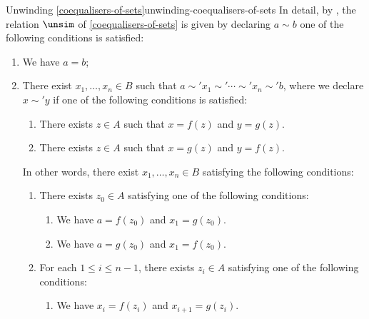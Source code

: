 \begin{remark}{Unwinding \cref{coequalisers-of-sets}}{unwinding-coequalisers-of-sets}%
    In detail, by , the relation $\unsim$ of \cref{coequalisers-of-sets} is given by declaring $a\sim b$ \textiff one of the following conditions is satisfied:%
    \begin{enumerate}
        \item\label{unwinding-coequalisers-of-sets-1}We have $a=b$;
        \item\label{unwinding-coequalisers-of-sets-2}There exist $x_{1},\ldots,x_{n}\in B$ such that $a\sim'x_{1}\sim'\cdots\sim'x_{n}\sim'b$, where we declare $x\sim'y$ if one of the following conditions is satisfied:
            \begin{enumerate}
                \item\label{unwinding-coequalisers-of-sets-2-a}There exists $z\in A$ such that $x=f(z)$ and $y=g(z)$.
                \item\label{unwinding-coequalisers-of-sets-2-b}There exists $z\in A$ such that $x=g(z)$ and $y=f(z)$.
            \end{enumerate}
            In other words, there exist $x_{1},\ldots,x_{n}\in B$ satisfying the following conditions:
            \begin{enumerate}
                \item\label{unwinding-coequalisers-of-sets-2-c}There exists $z_{0}\in A$ satisfying one of the following conditions:
                    \begin{enumerate}
                        \item\label{unwinding-coequalisers-of-sets-2-c-i} We have $a=f(z_{0})$ and $x_{1}=g(z_{0})$.
                        \item\label{unwinding-coequalisers-of-sets-2-c-ii} We have $a=g(z_{0})$ and $x_{1}=f(z_{0})$.
                    \end{enumerate}
                \item\label{unwinding-coequalisers-of-sets-2-d} For each $1\leq i\leq n-1$, there exists $z_{i}\in A$ satisfying one of the following conditions:
                    \begin{enumerate}
                        \item\label{unwinding-coequalisers-of-sets-2-d-i} We have $x_{i}=f(z_{i})$ and $x_{i+1}=g(z_{i})$.

\end{enumerate}
\end{enumerate}
\end{enumerate}
\end{remark}
